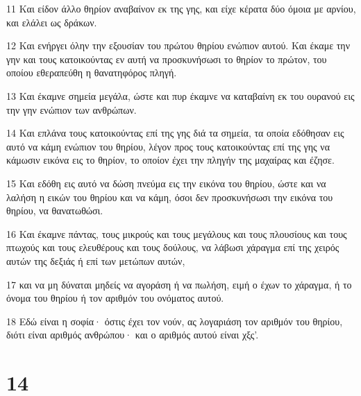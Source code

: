 \par 11 Και είδον άλλο θηρίον αναβαίνον εκ της γης, και είχε κέρατα δύο όμοια με αρνίου, και ελάλει ως δράκων.
\par 12 Και ενήργει όλην την εξουσίαν του πρώτου θηρίου ενώπιον αυτού. Και έκαμε την γην και τους κατοικούντας εν αυτή να προσκυνήσωσι το θηρίον το πρώτον, του οποίου εθεραπεύθη η θανατηφόρος πληγή.
\par 13 Και έκαμνε σημεία μεγάλα, ώστε και πυρ έκαμνε να καταβαίνη εκ του ουρανού εις την γην ενώπιον των ανθρώπων.
\par 14 Και επλάνα τους κατοικούντας επί της γης διά τα σημεία, τα οποία εδόθησαν εις αυτό να κάμη ενώπιον του θηρίου, λέγον προς τους κατοικούντας επί της γης να κάμωσιν εικόνα εις το θηρίον, το οποίον έχει την πληγήν της μαχαίρας και έζησε.
\par 15 Και εδόθη εις αυτό να δώση πνεύμα εις την εικόνα του θηρίου, ώστε και να λαλήση η εικών του θηρίου και να κάμη, όσοι δεν προσκυνήσωσι την εικόνα του θηρίου, να θανατωθώσι.
\par 16 Και έκαμνε πάντας, τους μικρούς και τους μεγάλους και τους πλουσίους και τους πτωχούς και τους ελευθέρους και τους δούλους, να λάβωσι χάραγμα επί της χειρός αυτών της δεξιάς ή επί των μετώπων αυτών,
\par 17 και να μη δύναται μηδείς να αγοράση ή να πωλήση, ειμή ο έχων το χάραγμα, ή το όνομα του θηρίου ή τον αριθμόν του ονόματος αυτού.
\par 18 Εδώ είναι η σοφία· όστις έχει τον νούν, ας λογαριάση τον αριθμόν του θηρίου, διότι είναι αριθμός ανθρώπου· και ο αριθμός αυτού είναι χξς'.

\chapter{14}

